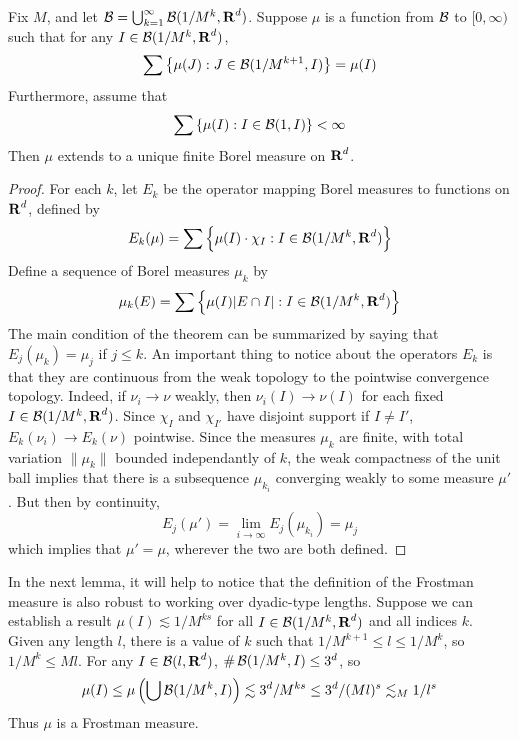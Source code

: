 \begin{lemma}
	Fix $M$, and let $\operatorname{\mathcal{B}} = \bigcup_{k = 1}^\infty \operatorname{\mathcal{B}}(1/M^k,\operatorname{\mathbf{R}}^d)$. Suppose $\mu$ is a function from $\operatorname{\mathcal{B}}$ to $[0,\infty)$ such that for any $I \in \operatorname{\mathcal{B}}(1/M^k,\operatorname{\mathbf{R}}^d)$,
	\[ \sum \left\{ \mu(J) :J \in \operatorname{\mathcal{B}}(1/M^{k+1},I) \right\} = \mu(I) \]
	Furthermore, assume that
	\[ \sum \left\{ \mu(I) : I \in \operatorname{\mathcal{B}}(1,I)  \right\} < \infty \]
	Then $\mu$ extends to a unique finite Borel measure on $\operatorname{\mathbf{R}}^d$.
\end{lemma}
\begin{proof}
	For each $k$, let $E_k$ be the operator mapping Borel measures to functions on $\operatorname{\mathbf{R}}^d$, defined by
	\[ E_k(\mu) = \sum \left\{ \mu(I) \cdot \chi_I : I \in \operatorname{\mathcal{B}}(1/M^k,\operatorname{\mathbf{R}}^d) \right\} \]
	Define a sequence of Borel measures $\mu_k$ by
	\[ \mu_k(E) = \sum \left\{ \mu(I) |E \cap I| : I \in \operatorname{\mathcal{B}}(1/M^k,\operatorname{\mathbf{R}}^d) \right\} \]
	The main condition of the theorem can be summarized by saying that $E_j(\mu_k) = \mu_j$ if $j \leq k$. An important thing to notice about the operators $E_k$ is that they are continuous from the weak topology to the pointwise convergence topology. Indeed, if $\nu_i \to \nu$ weakly, then $\nu_i(I) \to \nu(I)$ for each fixed $I \in \operatorname{\mathcal{B}}(1/M^k,\operatorname{\mathbf{R}}^d)$. Since $\chi_I$ and $\chi_{I'}$ have disjoint support if $I \neq I'$, $E_k(\nu_i) \to E_k(\nu)$ pointwise. Since the measures $\mu_k$ are finite, with total variation $\| \mu_k \|$ bounded independantly of $k$, the weak compactness of the unit ball implies that there is a subsequence $\mu_{k_i}$ converging weakly to some measure $\mu'$. But then by continuity,
	\[ E_j(\mu') = \lim_{i \to \infty} E_j(\mu_{k_i}) = \mu_j \]
	which implies that $\mu' = \mu$, wherever the two are both defined.
\end{proof}

In the next lemma, it will help to notice that the definition of the Frostman measure is also robust to working over dyadic-type lengths. Suppose we can establish a result $\mu(I) \lesssim 1/M^{ks}$ for all $I \in \operatorname{\mathcal{B}}(1/M^k,\operatorname{\mathbf{R}}^d)$ and all indices $k$. Given any length $l$, there is a value of $k$ such that $1/M^{k+1} \leq l \leq 1/M^k$, so $1/M^k \leq Ml$. For any $I \in \operatorname{\mathcal{B}}(l,\operatorname{\mathbf{R}}^d)$, $\# \operatorname{\mathcal{B}}(1/M^k,I) \leq 3^d$, so
%
\[ \mu(I) \leq \mu \left(\bigcup \operatorname{\mathcal{B}}(1/M^k,I) \right) \lesssim 3^d/M^{ks} \leq 3^d/(Ml)^s \lesssim_M 1/l^s \]
%
Thus $\mu$ is a Frostman measure.

